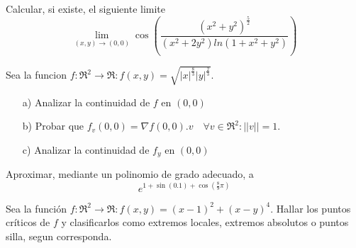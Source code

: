 
\begin{question}

Calcular, si existe, el siguiente limite
\[
        \lim_{(x,y)\to(0,0)} \cos\left({\frac{(x^2 + y^2)^{\frac{5}{2}}}{(x^2+2y^2)ln(1+x^2+y^2)}} \right)
    \]

\end{question}
\begin{question}
    Sea la funcion $f:\Re^2\rightarrow\Re: f(x,y)=\sqrt{|x|^{\frac{8}{3}}|y|^{\frac{2}{3}}}$.
\begin{itemize}
    \item[a)] Analizar la continuidad de $f$ en $(0,0)$
    \item[b)] Probar que  $f_v(0,0)=\nabla f(0,0).v \quad \forall v \in \Re^2: ||v||=1.$
    \item[c)] Analizar la continuidad de $f_y $ en $(0,0)$
\end{itemize}
\end{question}

\begin{question}
    Aproximar, mediante un polinomio de grado adecuado, a
    \[
        e^{1 + \sin(0.1) + \cos\left(\frac{8}{9} \pi\right)}
    \]
\end{question}
\begin{question}
    Sea la función $f:\Re^2 \rightarrow \Re : f(x,y)=(x-1)^2 + (x-y)^4$. Hallar los puntos críticos de $f$ y clasificarlos como extremos locales, extremos absolutos o puntos silla, segun corresponda.
\end{question}
\newpage

